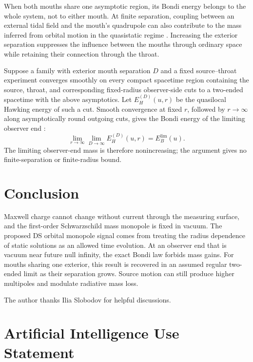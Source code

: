\documentclass[aps,prd,10pt,onecolumn,nofootinbib,superscriptaddress,floatfix]{revtex4-2}
\begin{document}
When both mouths share one asymptotic region, its Bondi energy belongs
to the whole system, not to either mouth.  At finite separation, coupling
between an external tidal field and the mouth's quadrupole can also
contribute to the mass inferred from orbital motion in the quasistatic
regime \cite[Sec.~I]{Favata2001TidalWork}.  Increasing the exterior
separation suppresses the influence between the mouths through ordinary
space while retaining their connection through the throat.

Suppose a family with exterior
mouth separation $D$ and a fixed source--throat experiment converges
smoothly on every compact spacetime region containing the source, throat,
and corresponding fixed-radius observer-side cuts to a two-ended
spacetime with the above asymptotics.  Let $E_H^{(D)}(u,r)$ be the quasilocal
Hawking energy of such a cut.  Smooth convergence at fixed $r$, followed by
$r\to\infty$ along asymptotically round outgoing cuts, gives the Bondi
energy of the limiting observer end \cite{MarsSoria2015HawkingEnergy}:
\begin{equation}
 \lim_{r\to\infty}\lim_{D\to\infty}E_H^{(D)}(u,r)
 =E_B^{\mathrm{lim}}(u).
 \label{eq:one-ended-limit}
\end{equation}
The limiting observer-end mass is therefore nonincreasing; the argument
gives no finite-separation or finite-radius bound.

\section{Conclusion}
\label{sec:conclusion}

Maxwell charge cannot change without current through the measuring
surface, and the first-order Schwarzschild mass monopole is fixed in
vacuum.  The proposed DS orbital monopole signal comes from treating the
radius dependence of static solutions as an allowed time evolution.
At an observer end that
is vacuum near future null infinity, the exact Bondi law forbids mass
gains.  For mouths sharing one exterior, this result is recovered in an
assumed regular two-ended limit as their separation grows.  Source motion
can still produce higher multipoles and modulate radiative mass loss.

\begin{acknowledgments}
The author thanks Ilia Slobodov for helpful discussions.
\end{acknowledgments}

\section*{Artificial Intelligence Use Statement}
\end{document}
